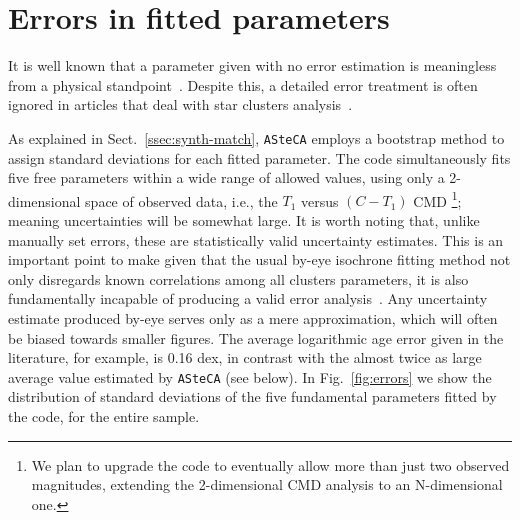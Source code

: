 \documentclass[referee]{aa}
\begin{document}

\section{Errors in fitted parameters}
\label{sec:errors-fit}

It is well known that a parameter given with no error estimation is
meaningless from a physical standpoint~\citep{Dolphin_2002,Andrae_2010}.
%
Despite this, a detailed error treatment is often ignored in
articles that deal with star clusters analysis~\citep{Paunzen_2006}.

As explained in Sect.~\ref{ssec:synth-match}, \texttt{ASteCA} employs a
bootstrap method to assign standard deviations for each fitted parameter.
%
The code simultaneously fits five free parameters within a wide range of allowed
values, using only a 2-dimensional space of observed data, i.e., the $T_1$
versus $ (C-T_1)$ CMD \footnote{We plan to upgrade the code to eventually allow
more than just two observed magnitudes, extending the 2-dimensional CMD analysis
to an N-dimensional one.}; meaning uncertainties will be somewhat large.
%
It is worth noting that, unlike manually set errors, these are
statistically valid uncertainty estimates. This is an important point to make
given that the usual by-eye isochrone fitting method not only disregards known
correlations among all clusters parameters, it is also fundamentally incapable
of producing a valid error analysis~\citep{Naylor_2006}. Any uncertainty
estimate produced by-eye serves only as a mere approximation, which will often
be biased towards smaller figures. The average logarithmic age error given in
the literature, for example, is 0.16 dex, in contrast with the almost twice as
large average value estimated by \texttt{ASteCA} (see below).
%
In Fig.~\ref{fig:errors} we show the distribution of standard deviations
of the five fundamental parameters fitted by the code, for the entire sample.
\end{document}
